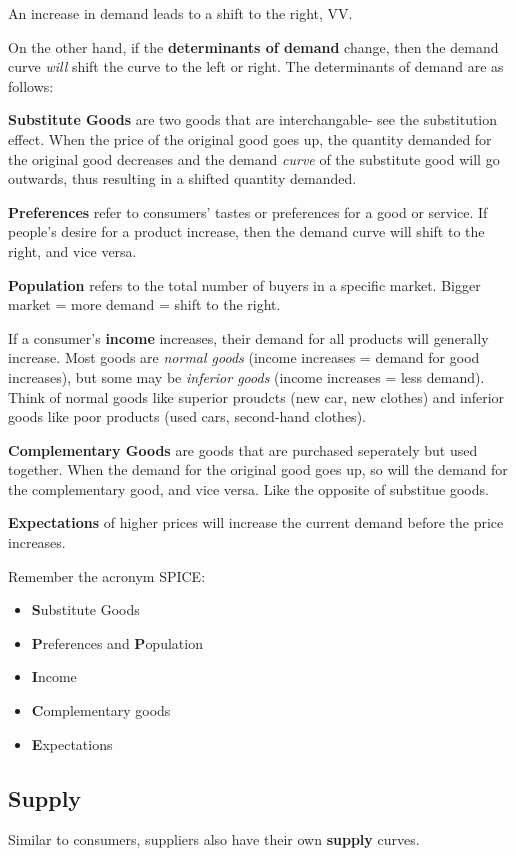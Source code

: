 \documentclass[12pt, a4paper]{article}
\theoremstyle{definition}
\begin{document}
An increase in demand leads to a shift to the right, VV.

On the other hand, if the \textbf{determinants of demand} change, then the demand curve \textit{will} shift the curve to the left or right.
The determinants of demand are as follows:

\textbf{Substitute Goods} are two goods that are interchangable- see the substitution effect.
When the price of the original good goes up, the quantity demanded for the original good decreases and the demand \textit{curve} of the substitute good will go outwards, thus resulting in a shifted quantity demanded.

\textbf{Preferences} refer to consumers' tastes or preferences for a good or service.
If people's desire for a product increase, then the demand curve will shift to the right, and vice versa.

\textbf{Population} refers to the total number of buyers in a specific market.
Bigger market = more demand = shift to the right.

If a consumer's \textbf{income} increases, their demand for all products will generally increase.
Most goods are \textit{normal goods} (income increases = demand for good increases), but some may be \textit{inferior goods} (income increases = less demand).
Think of normal goods like superior proudcts (new car, new clothes) and inferior goods like poor products (used cars, second-hand clothes).

\textbf{Complementary Goods} are goods that are purchased seperately but used together.
When the demand for the original good goes up, so will the demand for the complementary good, and vice versa.
Like the opposite of substitue goods.

\textbf{Expectations} of higher prices will increase the current demand before the price increases.

Remember the acronym SPICE:
\begin{itemize}
    \item \textbf{S}ubstitute Goods
    \item \textbf{P}references and \textbf{P}opulation
    \item \textbf{I}ncome
    \item \textbf{C}omplementary goods
    \item \textbf{E}xpectations
\end{itemize}

\subsection{Supply}
Similar to consumers, suppliers also have their own \textbf{supply} curves.
\end{document}
